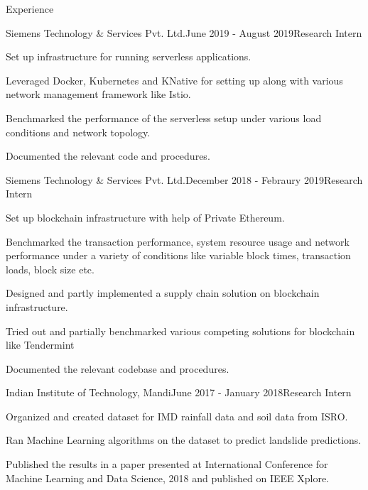 \documentclass{resume} %
\begin{document}
\begin{rSection}{Experience}

\begin{rSubsection}{Siemens Technology \& Services Pvt. Ltd.}{June 2019 - August 2019}{Research Intern}{}
\item Set up infrastructure for running serverless applications.
\item Leveraged Docker, Kubernetes and KNative for setting up along with various network management framework like Istio.
\item Benchmarked the performance of the serverless setup under various load conditions and network topology.
\item Documented the relevant code and procedures. 
\end{rSubsection}


\begin{rSubsection}{Siemens Technology \& Services Pvt. Ltd.}{December 2018 - Febraury 2019}{Research Intern}{}
\item Set up blockchain infrastructure with help of Private Ethereum.
\item Benchmarked the transaction performance, system resource usage and network performance under a variety of conditions like variable block times, transaction loads, block size etc.
\item Designed and partly implemented a supply chain solution on blockchain infrastructure.
\item Tried out and partially benchmarked various competing solutions for blockchain like Tendermint
\item Documented the relevant codebase and procedures.
\end{rSubsection}


\begin{rSubsection}{Indian Institute of Technology, Mandi}{June 2017 - January 2018}{Research Intern}{}
\item Organized and created dataset for IMD rainfall data and soil data from ISRO.
\item Ran Machine Learning algorithms on the dataset to predict landslide predictions.
\item Published the results in a paper presented at International Conference for Machine Learning and Data Science, 2018 and published on IEEE Xplore.
\end{rSubsection}

\end{rSection}
\end{document}
